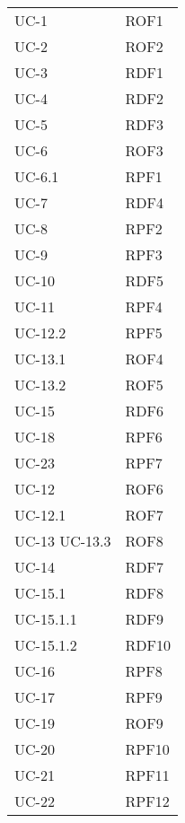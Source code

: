 \begin{longtable}{| p{5cm} | p{5cm} |}
		
		
		UC-1 & ROF1 \\
		UC-2 & ROF2 \\
		UC-3 & RDF1 \\
		UC-4 & RDF2 \\
		UC-5 & RDF3 \\
		UC-6 & ROF3 \\
		UC-6.1 & RPF1 \\
		UC-7 & RDF4 \\
		UC-8 & RPF2 \\
		UC-9 & RPF3 \\
		UC-10 & RDF5 \\
		UC-11 & RPF4 \\
		UC-12.2 & RPF5 \\
		UC-13.1 & ROF4 \\
		UC-13.2 & ROF5 \\
		UC-15 & RDF6 \\
		UC-18 & RPF6 \\
		UC-23 & RPF7 \\
		UC-12 & ROF6 \\
		UC-12.1 &ROF7 \\
		UC-13 \newline UC-13.3 & ROF8 \\
		UC-14 & RDF7 \\
		UC-15.1 & RDF8 \\
		UC-15.1.1 & RDF9 \\
		UC-15.1.2 & RDF10\\
		UC-16 & RPF8 \\
		UC-17 & RPF9 \\
		UC-19 & ROF9 \\
		UC-20 & RPF10 \\
		UC-21 & RPF11 \\
		UC-22 & RPF12 \\ 
		

\end{longtable}
